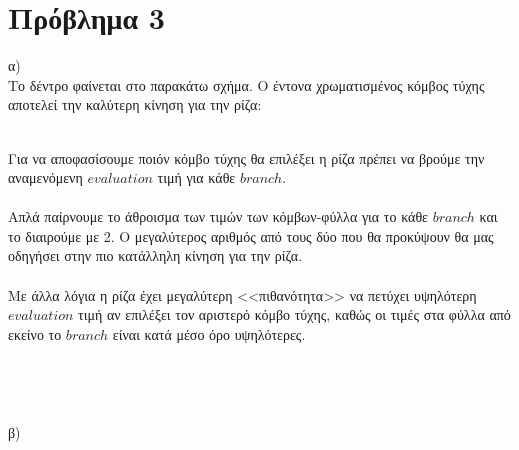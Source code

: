 \documentclass[12pt]{article}
\begin{document}
\section*{Πρόβλημα 3}
α)\\
Το δέντρο φαίνεται στο παρακάτω σχήμα. O έντονα χρωματισμένος κόμβος τύχης αποτελεί την καλύτερη κίνηση για την ρίζα:\\\\
\begin{center}
    
\end{center}
Για να αποφασίσουμε ποιόν κόμβο τύχης θα επιλέξει η ρίζα πρέπει να βρούμε την αναμενόμενη $evaluation$ τιμή για κάθε $branch$.\\\\
Απλά παίρνουμε το άθροισμα των τιμών των κόμβων-φύλλα για το κάθε $branch$ και το διαιρούμε με 2. Ο μεγαλύτερος αριθμός από τους δύο που θα προκύψουν θα μας οδηγήσει στην πιο κατάλληλη κίνηση για την ρίζα.\\\\
Με άλλα λόγια η ρίζα έχει μεγαλύτερη <<πιθανότητα>> να πετύχει υψηλότερη  $evaluation$ τιμή αν επιλέξει τον αριστερό κόμβο τύχης, καθώς οι τιμές στα φύλλα από εκείνο το $branch$ είναι κατά μέσο όρο υψηλότερες.\\\\\\\\\\
β)\\
\end{document}
